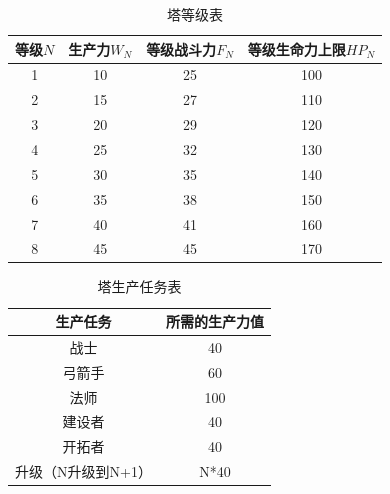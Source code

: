 \documentclass[a4paper,4pt]{article}
\begin{document}
\begin{table}[htbp]
  \centering
  \caption{塔等级表}

  \begin{tabular}{c|c|c|c}
    \hline
    等级$N$ & 生产力$W_N$ & 等级战斗力$F_N$ & 等级生命力上限$HP_N$ \bigstrut \\
    \hline
    1       & 10          & 25              & 100 \bigstrut                  \\
    \hline
    2       & 15          & 27              & 110 \bigstrut                  \\
    \hline
    3       & 20          & 29              & 120 \bigstrut                  \\
    \hline
    4       & 25          & 32              & 130 \bigstrut                  \\
    \hline
    5       & 30          & 35              & 140 \bigstrut                  \\
    \hline
    6       & 35          & 38              & 150 \bigstrut                  \\
    \hline
    7       & 40          & 41              & 160 \bigstrut                  \\
    \hline
    8       & 45          & 45              & 170 \bigstrut                  \\
    \hline
  \end{tabular}%
  \label{塔等级表}%
\end{table}%


\begin{table}[htbp]
  \centering
  \caption{塔生产任务表}
  \begin{tabular}{c|c}
    \hline
    生产任务           & 所需的生产力值 \bigstrut \\
    \hline
    战士               & 40 \bigstrut             \\
    \hline
    弓箭手             & 60 \bigstrut             \\
    \hline
    法师               & 100 \bigstrut            \\
    \hline
    建设者             & 40 \bigstrut             \\
    \hline
    开拓者             & 40 \bigstrut             \\
    \hline
    升级（N升级到N+1） & N*40 \bigstrut           \\
    \hline
  \end{tabular}%
  \label{塔生产}%
\end{table}%
\end{document}
